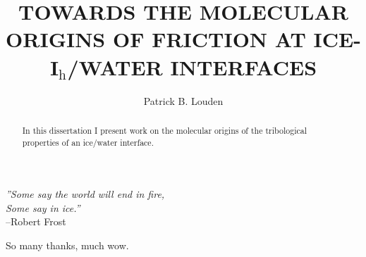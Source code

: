 \documentclass[noinfo,final,sort&compress]{nddiss2e}
\begin{document}
\frontmatter %

\title{TOWARDS THE MOLECULAR ORIGINS OF FRICTION AT
  ICE-I$_\mathrm{h}$/WATER INTERFACES}
\author{Patrick B. Louden}
\maketitle

\makecopyright

\begin{abstract}
In this dissertation I present work on the molecular origins of the
tribological properties of an ice/water interface. 
\end{abstract}


\tableofcontents
\listoffigures
\listoftables

\begin{preface}
\vfill
\begin{flushright}
\textit{''Some say the world will end in fire,} \\
\textit{Some say in ice.''}\\
--Robert Frost
\end{flushright}
\vfill
\end{preface}

\begin{acknowledge}
So many thanks, much wow.
\end{acknowledge}

\mainmatter

%


\end{document}

